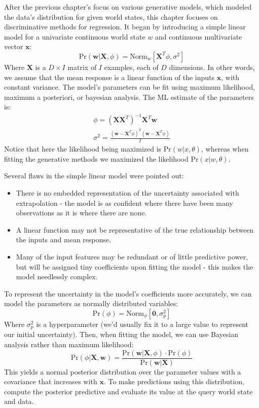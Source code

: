 \documentclass[idxtotoc,hyperref,openany]{labbook} %
\begin{document}
 After the previous chapter's focus on various generative models, which modeled the data's distribution for given world states, this chapter focuses on discriminative methods for regression. It began by introducing a simple linear model for a univariate continuous world state $w$ and continuous multivariate vector $\mathbf{x}$:
 \[
 	\text{Pr}(\mathbf{w}|\mathbf{X}, \phi) = \text{Norm}_w[\mathbf{X}^T \phi, \sigma^2]
 \]
 Where $\mathbf{X}$ is a $D \times I$ matrix of $I$ examples, each of $D$ dimensions. In other words, we assume that the mean response is a linear function of the inputs $\mathbf{x}$, with constant variance. The model's parameters can be fit using maximum likelihood, maximum a posteriori, or bayesian analysis. The ML estimate of the parameters is:
 \begin{gather*}
 	\phi = (\mathbf{X}\mathbf{X}^T)^{-1}\mathbf{X}^T \mathbf{w}\\[1em]
 	\sigma^2 = \frac{(\mathbf{w} - \mathbf{X}^T\phi)^T(\mathbf{w} - \mathbf{X}^T\phi)}{I} 
 \end{gather*}
Notice that here the likelihood being maximized is $\text{Pr}(w|x, \theta)$, whereas when fitting the generative methods we maximized the likelihood $\text{Pr}(x|w, \theta)$.

Several flaws in the simple linear model were pointed out:
\begin{itemize}
	\item There is no embedded representation of the uncertainty associated with extrapolation - the model is as confident where there have been many observations as it is where there are none.
	\item A linear function may not be representative of the true relationship between the inputs and mean response.
	\item Many of the input features may be redundant or of little predictive power, but will be assigned tiny coefficients upon fitting the model - this makes the model needlessly complex.
\end{itemize}
To represent the uncertainty in the model's coefficients more accurately, we can model the parameters as normally distributed variables:
\[
	\text{Pr}(\phi) = \text{Norm}_{\phi}[\mathbf{0}, \sigma_p^2]
\]
Where $\sigma_p^2$ is a hyperparameter (we'd usually fix it to a large value to represent our initial uncertainty). Then, when fitting the model, we can use Bayesian analysis rather than maximum likelihood:
\[
	\text{Pr}(\phi|\mathbf{X}, \mathbf{w}) = \frac{\text{Pr}(\mathbf{w}|\mathbf{X}, \phi)\cdot \text{Pr}(\phi)}{\text{Pr}(\mathbf{w}|\mathbf{X})}
\]
This yields a normal posterior distribution over the parameter values with a covariance that increases with $\mathbf{x}$. To make predictions using this distribution, compute the posterior predictive and evaluate its value at the query world state and data.
\end{document}
